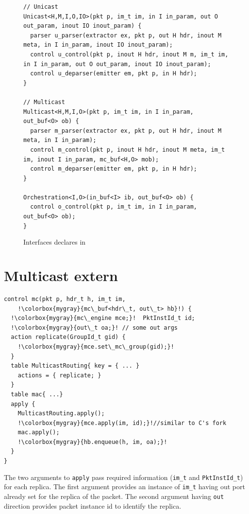 \documentclass[letterpaper,twocolumn,10pt]{article}
\begin{document}
\begin{figure}[h]
\begin{lstlisting}[frame=none]
// Unicast
Unicast<H,M,I,O,IO>(pkt p, im_t im, in I in_param, out O out_param, inout IO inout_param) {
  parser u_parser(extractor ex, pkt p, out H hdr, inout M meta, in I in_param, inout IO inout_param);
  control u_control(pkt p, inout H hdr, inout M m, im_t im, in I in_param, out O out_param, inout IO inout_param);
  control u_deparser(emitter em, pkt p, in H hdr);                             
}

// Multicast
Multicast<H,M,I,O>(pkt p, im_t im, in I in_param, out_buf<O> ob) {
  parser m_parser(extractor ex, pkt p, out H hdr, inout M meta, in I in_param);
  control m_control(pkt p, inout H hdr, inout M meta, im_t im, inout I in_param, mc_buf<H,O> mob);
  control m_deparser(emitter em, pkt p, in H hdr);
}

Orchestration<I,O>(in_buf<I> ib, out_buf<O> ob) {                         
  control o_control(pkt p, im_t im, in I in_param, out_buf<O> ob);
}    
\end{lstlisting}
\caption{Interfaces declares in \uarch}
\label{fig:programmable-blocks-for-interfaces}
\end{figure}








\section{Multicast extern}
\label{app:multicast}
\begin{lstlisting}[frame=none, escapechar=!]
control mc(pkt p, hdr_t h, im_t im,
    !\colorbox{mygray}{mc\_buf<hdr\_t, out\_t> hb}!) {
  !\colorbox{mygray}{mc\_engine mce;}!  PktInstId_t id; 
  !\colorbox{mygray}{out\_t oa;}! // some out args
  action replicate(GroupId_t gid) {
    !\colorbox{mygray}{mce.set\_mc\_group(gid);}!
  }
  table MulticastRouting{ key = { ... } 
    actions = { replicate; }
  }
  table mac{ ...}
  apply {
    MulticastRouting.apply();
    !\colorbox{mygray}{mce.apply(im, id);}!//similar to C's fork
    mac.apply();
    !\colorbox{mygray}{hb.enqueue(h, im, oa);}!
  }
}
\end{lstlisting}
The two arguments to \texttt{apply} pass required information
(\texttt{im\_t} and \texttt{PktInstId\_t}) for each replica. The first
argument provides an instance of \texttt{im\_t} having out port
already set for the replica of the packet.  The second argument having
\texttt{out} direction provides packet instance id to identify the
replica.
\end{document}
